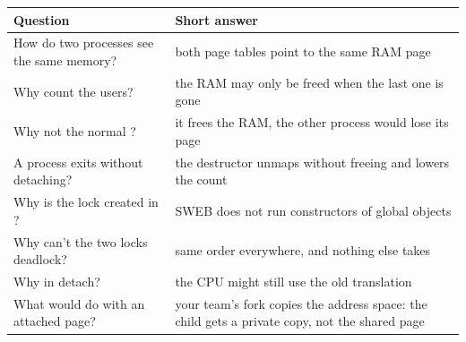 \documentclass[11pt]{report}
\begin{document}
{\small
\begin{tabular}{@{}L{6.2cm} L{9.0cm}@{}}
\toprule
\textbf{Question} & \textbf{Short answer}\\\midrule
How do two processes see the same memory? & both page tables point to the same RAM page\\
Why count the users? & the RAM may only be freed when the last one is gone\\
Why not the normal ? & it frees the RAM, the other process would lose its page\\
A process exits without detaching? & the destructor unmaps without freeing and lowers the count\\
Why is the lock created in ? & SWEB does not run constructors of global objects\\
Why can't the two locks deadlock? & same order everywhere, and nothing else takes \\
Why  in detach? & the CPU might still use the old translation\\
What would  do with an attached page? & your team's fork copies the address space: the child gets a private copy, not the shared page\\
\bottomrule
\end{tabular}}
\end{document}
